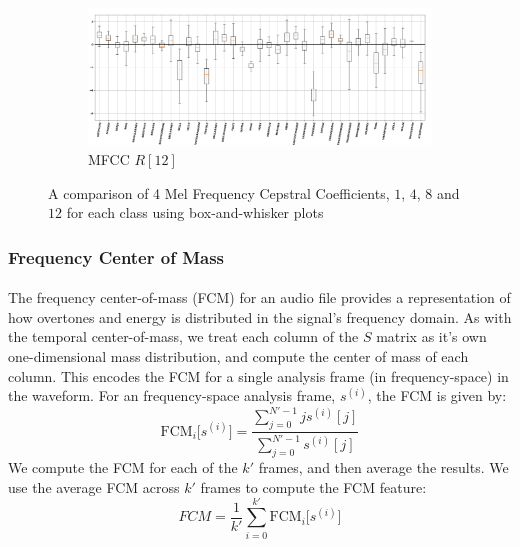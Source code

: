 \documentclass[12pt,letterpaper]{article}
\begin{document}
\begin{figure}[H]
\begin{center}
	\begin{subfigure}{1.0\textwidth}
	\centering
	\includegraphics[width=\textwidth , height=0.2\textheight]
		{../FiguresFeatures/MFCC_12}
	\caption{MFCC $R[12]$}
	\end{subfigure}	

\end{center}
\caption{A comparison of 4 Mel Frequency Cepstral Coefficients, $1$, $4$, $8$ and $12$ for each class using box-and-whisker plots}
\label{fig-FeatureMFCCs}
\end{figure}


\subsubsection{Frequency Center of Mass}

\paragraph*{}The frequency center-of-mass (FCM) for an audio file provides a representation of how overtones and energy is distributed in the signal's frequency domain. As with the temporal center-of-mass, we treat each column of the $S$ matrix as it's own one-dimensional mass distribution, and compute the center of mass of each column. This encodes the FCM for a single analysis frame (in frequency-space) in the waveform. For an frequency-space analysis frame, $s^{(i)}$, the FCM is given by:
\begin{equation}
\label{eqn-FeatureFCM}
\text{FCM}_{i}\big[ s^{(i)} \big] = \frac{\sum_{j=0}^{N'-1}j s^{(i)}[j]}{\sum_{j=0}^{N'-1}s^{(i)}[j]}
\end{equation}
We compute the FCM for each of the $k'$ frames, and then average the results. We use the average FCM across $k'$ frames to compute the FCM feature:
\begin{equation}
FCM = \frac{1}{k'}\sum_{i=0}^{k'}\text{FCM}_{i}\big[ s^{(i)} \big]
\end{equation}
\end{document}
